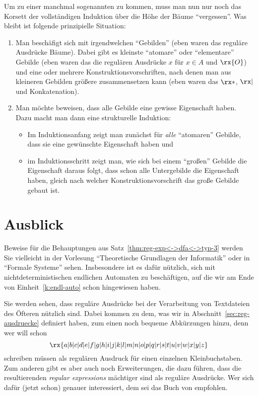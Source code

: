 \noindent
Um zu einer manchmal sogenannten %
 zu kommen, muss man nun nur noch
das Korsett der vollständigen Induktion über die Höhe der Bäume
"`vergessen"'. Was bleibt ist folgende prinzipielle Situation:
\begin{enumerate}
\item Man beschäfigt sich mit irgendwelchen "`Gebilden"' (eben waren
  das reguläre Ausdrücke \bzw Bäume). Dabei gibt es kleinste
  "`atomare"' oder "`elementare"' Gebilde (eben waren das die
  regulären Ausdrücke $x$ für $x\in A$ und $\rx{O}$) und eine oder
  mehrere Konstruktionsvorschriften, nach denen man aus kleineren
  Gebilden größere zusammensetzen kann (eben waren das $\rx*$, $\rx|$
  und Konkatenation).
\item Man möchte beweisen, dass alle Gebilde eine gewisse Eigenschaft
  haben. Dazu macht man dann eine strukturelle Induktion:
  \begin{itemize}
  \item Im Induktionsanfang zeigt man zunächst für \emph{alle}
    "`atomaren"' Gebilde, dass sie eine gewünschte Eigenschaft haben
    und
  \item im Induktionsschritt zeigt man, wie sich bei einem "`großen"'
    Gebilde die Eigenschaft daraus folgt, dass schon alle Untergebilde
    die Eigenschaft haben, gleich nach welcher Konstruktionsvorschrift
    das große Gebilde gebaut ist.
  \end{itemize}
\end{enumerate}

\section{Ausblick}

Beweise für die Behauptungen aus Satz~\ref{thm:reg-exp<->dfa<->typ-3}
werden Sie vielleicht in der Vorlesung "`Theoretische Grundlagen der
Informatik"' oder in "`Formale Systeme"' sehen. Insbesondere ist es
dafür nützlich, sich mit nichtdeterministischen endlichen Automaten zu
beschäftigen, auf die wir am Ende von Einheit~\ref{k:endl-auto} schon
hingewiesen haben.

Sie werden sehen, dass reguläre Ausdrücke bei der Verarbeitung von
Textdateien des Öfteren nützlich sind. Dabei kommen zu dem, was wir in
Abschnitt~\ref{sec:reg-ausdruecke} definiert haben, zum einen noch
bequeme Abkürzungen hinzu, denn wer will schon \zB
\[
\rx{a|b|c|d|e|f|g|h|i|j|k|l|m|n|o|p|q|r|s|t|u|v|w|x|y|z}
\]
schreiben müssen als regulären Ausdruck für einen einzelnen
Kleinbuchstaben. Zum anderen gibt es aber auch noch Erweiterungen, die
dazu führen, dass die resultierenden \emph{regular expressions}
mächtiger sind als reguläre Ausdrücke. Wer sich dafür (jetzt schon)
genauer interessiert, dem sei das Buch von
\textcite{Friedl_2006_MRE_bk} empfohlen.

